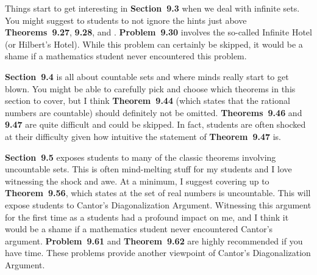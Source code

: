\documentclass[11pt]{article}%
\newcommand{\blankline}{\pagebreak[2]\vspace{.5\baselineskip}}
\begin{document}
\blankline

Things start to get interesting in \textbf{Section~9.3} when we deal with infinite sets.  You might suggest to students to not ignore the hints just above \textbf{Theorems~9.27}, \textbf{9.28}, and .  \textbf{Problem~9.30} involves the so-called Infinite Hotel (or Hilbert's Hotel). While this problem can certainly be skipped, it would be a shame if a mathematics student never encountered this problem.   

\blankline

\textbf{Section~9.4} is all about countable sets and where minds really start to get blown. You might be able to carefully pick and choose which theorems in this section to cover, but I think \textbf{Theorem~9.44} (which states that the rational numbers are countable) should definitely not be omitted.  \textbf{Theorems~9.46} and \textbf{9.47} are quite difficult  and could be skipped. In fact, students are often shocked at their difficulty given how intuitive the statement of \textbf{Theorem~9.47} is.

\blankline

\textbf{Section~9.5} exposes students to many of the classic theorems involving uncountable sets.  This is often mind-melting stuff for my students and I love witnessing the shock and awe.  At a minimum, I suggest covering up to \textbf{Theorem~9.56}, which states at the set of real numbers is uncountable. This will expose students to Cantor's Diagonalization Argument.  Witnessing this argument for the first time as a students had a profound impact on me, and I think it would be a shame if a mathematics student never encountered Cantor's argument.  \textbf{Problem~9.61} and \textbf{Theorem~9.62} are highly recommended if you have time. These problems provide another viewpoint of Cantor's Diagonalization Argument.
\end{document}
